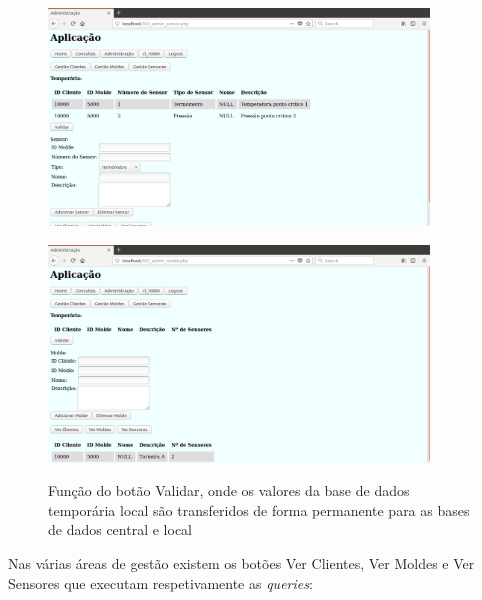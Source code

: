 \documentclass[11pt,twoside,a4paper]{report}
\begin{document}
\begin{figure}[H]
	\centering
	\begin{minipage}{.5\textwidth}
		\begin{center}
			\includegraphics[width=0.9\textwidth]{administracao07} %
			\label{fig:admin12}
		\end{center}
	\end{minipage}%
	\begin{minipage}{.5\textwidth}
		\begin{center}
			\includegraphics[width=0.9\textwidth]{administracao08} %
			\label{fig:admin13}
		\end{center}
	\end{minipage}
	\caption{Função do botão Validar, onde os valores da base de dados temporária local são transferidos de forma permanente para as bases de dados central e local}
	\label{fig:admin11}
\end{figure}
Nas várias áreas de gestão existem os botões Ver Clientes, Ver Moldes e Ver Sensores que executam respetivamente as \textit{queries}:
\end{document}

